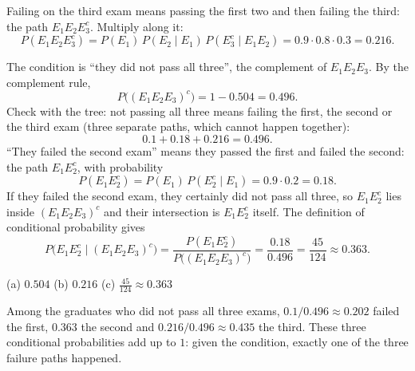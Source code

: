 \begin{solution}
	 Failing on the third exam means passing the first two
	and then failing the third: the path $E_1E_2E_3^c$. Multiply along it:
	\[ P(E_1E_2E_3^c)=P(E_1)\,P(E_2\mid E_1)\,P(E_3^c\mid E_1E_2)
		=0.9\cdot0.8\cdot0.3=0.216. \]

	 The condition is ``they did not pass all three'', the complement
	of $E_1E_2E_3$. By the complement rule,
	\[ P\big((E_1E_2E_3)^c\big)=1-0.504=0.496. \]
	Check with the tree: not passing all three means failing the first, the
	second or the third exam (three separate paths, which cannot happen
	together):
	\[ 0.1+0.18+0.216=0.496. \]
	``They failed the second exam'' means they passed the first and failed the
	second: the path $E_1E_2^c$, with probability
	\[ P(E_1E_2^c)=P(E_1)\,P(E_2^c\mid E_1)=0.9\cdot0.2=0.18. \]
	If they failed the second exam, they certainly did not pass all three, so
	$E_1E_2^c$ lies inside $(E_1E_2E_3)^c$ and their intersection is
	$E_1E_2^c$ itself. The definition of conditional probability gives
	\[ P\big(E_1E_2^c\mid(E_1E_2E_3)^c\big)
		=\frac{P(E_1E_2^c)}{P\big((E_1E_2E_3)^c\big)}
		=\frac{0.18}{0.496}=\frac{45}{124}\approx0.363. \]
	\begin{answer}
		(a) $0.504$ \quad (b) $0.216$ \quad (c) $\frac{45}{124}\approx0.363$
	\end{answer}
	\begin{remark}
		Among the graduates who did not pass all three exams, $0.1/0.496\approx
		0.202$ failed the first, $0.363$ the second and $0.216/0.496\approx0.435$
		the third. These three conditional probabilities add up to $1$: given the
		condition, exactly one of the three failure paths happened.
	\end{remark}
\end{solution}
